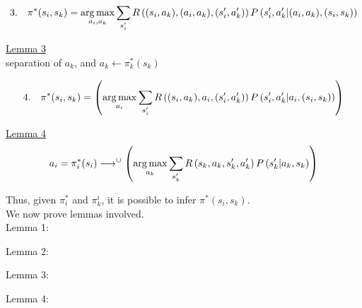  \begin{equation*}
3.\quad\pi^\ast(s_i, s_k) = \operatorname*{arg\,max}_{a_i, a_k} \sum_{s^\prime_i}  R\left((s_i, a_k), (a_i,a_k),(s^\prime_i, a^\prime_k) \right) P\left( s^\prime_i, a^\prime_k \middle| (a_i,a_k),  (s_i, s_k) \right) 
\end{equation*}

\underline{Lemma 3}\\

\textasteriskcentered \quad separation of $a_k$, and $a_k \leftarrow \pi^{\ast}_k(s_k)$

 \begin{equation*}
4.\quad\pi^\ast(s_i, s_k) =\left( \operatorname*{arg\,max}_{a_i} \sum_{s^\prime_i}  R\left((s_i, a_k), a_i,(s^\prime_i, a^\prime_k) \right) P\left( s^\prime_i, a^\prime_k \middle| a_i,  (s_i, s_k) \right) \right)
\end{equation*}

\textasteriskcentered \quad \underline{Lemma 4}\\

\begin{equation*}
a_i = \pi^\ast_i(s_i) \longrightarrow^{\cup} \left( \operatorname*{arg\,max}_{a_k} \sum_{s^\prime_k}  R\left(s_k, a_k, s^\prime_k, a^\prime_k \right) P\left( s^\prime_k \middle| a_k, s_k \right) \right)
\end{equation*}

\begin{center}
\end{center}

Thus, given $\pi^\ast_i$ and $\pi^{i}_{k}$, it is possible to infer $\pi^\ast \left( s_i, s_k \right)$.\\

We now prove lemmas involved.\\

Lemma 1:\\
\vspace*{4cm}

Lemma 2:\\
\vspace*{4cm}

Lemma 3:\\
\vspace*{4cm}

Lemma 4:\\
\vspace*{4cm}